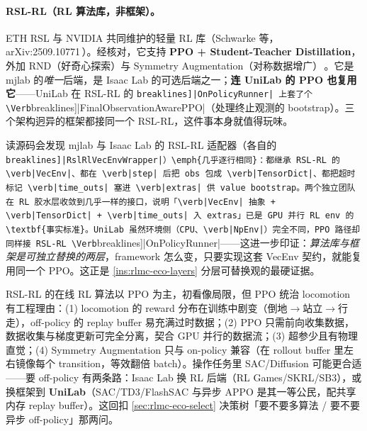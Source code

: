 \paragraph{RSL-RL（RL 算法库，非框架）。}ETH RSL 与 NVIDIA 共同维护的轻量 RL 库（Schwarke 等，arXiv:2509.10771\,\cite{schwarke2025rslrl}）。经核对，它支持 \textbf{PPO + Student-Teacher Distillation}，外加 RND（好奇心探索）与 Symmetry Augmentation（对称数据增广）\,\cite{schwarke2025rslrl}。它是 mjlab 的\emph{唯一}后端，是 Isaac Lab 的可选后端之一；\textbf{连 UniLab 的 PPO 也复用它}——UniLab 在 RSL-RL 的 \Verb[breaklines]|OnPolicyRunner| 上套了个 \Verb[breaklines]|FinalObservationAwarePPO|（处理终止观测的 bootstrap）。三个架构迥异的框架都接同一个 RSL-RL，这件事本身就值得玩味。

\begin{insight}\label{ins:rlmc-eco-vecenv}
读源码会发现 mjlab 与 Isaac Lab 的 RSL-RL 适配器（各自的 \Verb[breaklines]|RslRlVecEnvWrapper|）\emph{几乎逐行相同}：都继承 RSL-RL 的 \verb|VecEnv|、都在 \verb|step| 后把 obs 包成 \verb|TensorDict|、都把超时标记 \verb|time_outs| 塞进 \verb|extras| 供 value bootstrap。两个独立团队在 RL 胶水层收敛到几乎一样的接口，说明「\verb|VecEnv| 抽象 + \verb|TensorDict| + \verb|time_outs| 入 extras」已是 GPU 并行 RL env 的\textbf{事实标准}。UniLab 虽然环境侧（CPU、\verb|NpEnv|）完全不同，PPO 路径却同样接 RSL-RL \Verb[breaklines]|OnPolicyRunner|——这进一步印证：\emph{算法库与框架是可独立替换的两层}，framework 怎么变，只要实现这套 VecEnv 契约，就能复用同一个 PPO。这正是 \cref{ins:rlmc-eco-layers} 分层可替换观的最硬证据。
\end{insight}

\begin{insight}\label{ins:rlmc-eco-ppo}
RSL-RL 的在线 RL 算法以 PPO 为主，初看像局限，但 PPO 统治 locomotion 有工程理由：(1) locomotion 的 reward 分布在训练中剧变（倒地$\to$站立$\to$行走），off-policy 的 replay buffer 易充满过时数据；(2) PPO 只需前向收集数据，数据收集与梯度更新可完全分离，契合 GPU 并行的数据流；(3) 超参少且有物理直觉；(4) Symmetry Augmentation 只与 on-policy 兼容（在 rollout buffer 里左右镜像每个 transition，等效翻倍 batch）。操作任务里 SAC/Diffusion 可能更合适——要 off-policy 有两条路：Isaac Lab 换 RL 后端（RL Games/SKRL/SB3），或换框架到 \textbf{UniLab}（SAC/TD3/FlashSAC 与异步 APPO 是其一等公民，配共享内存 replay buffer）。这回扣 \cref{sec:rlmc-eco-select} 决策树「要不要多算法 / 要不要异步 off-policy」那两问。
\end{insight}


